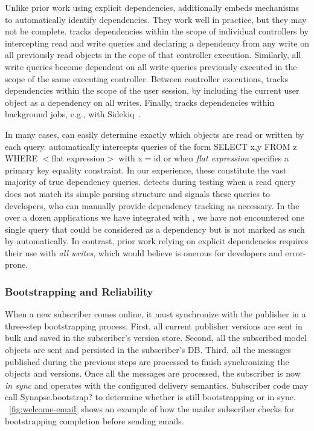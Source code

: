 Unlike prior work using explicit dependencies, \synapse additionally embeds
mechanisms to automatically identify dependencies.  They work well in
practice, but they may not be complete.  \synapse tracks dependencies
within the scope of individual controllers by intercepting read and write
queries and declaring a dependency from any write on all previously read objects
in the cope of that controller execution.  Similarly, all write queries
become dependent on all write queries previously executed in the scope of the
same executing controller. Between controller executions, \synapse tracks
dependencies within the scope of the user session, by including the current user
object as a dependency on all writes.  Finally, \synapse tracks dependencies
within background jobs, e.g., with Sidekiq~\cite{sidekiq}.

In many cases, \synapse can easily determine exactly which objects are read
or written by each query. \synapse automatically intercepts queries of the
form { \code SELECT x,y FROM z WHERE $<$flat expression$>$} with {\code x$=$id}
or when {\em flat expression} specifies a primary key equality constraint.
In our experience, these constitute the vast majority of true dependency
queries.  \synapse detects during testing when a read query does not match its
simple parsing structure and signals these queries to developers, who can
manually provide dependency tracking as necessary.  In the over a dozen
applications we have integrated with \synapse, we have not encountered one
single query that could be considered as a dependency but is not marked as such
by \synapse automatically.  In contrast, prior work relying on explicit
dependencies requires their use with {\em all writes}, which would believe is
onerous for developers and error-prone.

\subsubsection{Bootstrapping and Reliability} \label{sec:arch:bootstrapping}

When a new subscriber comes online, it must synchronize with the publisher in a
three-step bootstrapping process. First, all current publisher versions are sent
in bulk and saved in the subscriber's version store. Second, all the subscribed model
objects are sent and persisted in the subscriber's DB. Third, all the messages
published during the previous steps are processed to finish synchronizing the
objects and versions. Once all the messages are processed, the subscriber is now
{\em in sync} and operates with the configured delivery semantics.
Subscriber code may call {\code Synapse.bootstrap?} to determine whether \synapse
is still bootstrapping or in sync. \F~\ref{fig:welcome-email} shows an example of
how the mailer subscriber checks for bootstrapping completion before sending emails.

